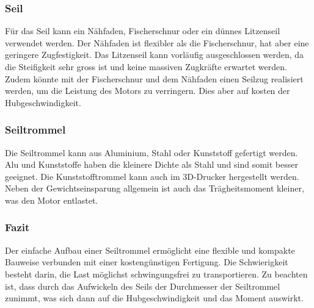 \documentclass[a4paper]{report}
\begin{document}
\subsubsection{Seil}
\label{app:ssec:Seil}
Für das Seil kann ein Nähfaden, Fischerschnur oder ein dünnes Litzenseil verwendet werden. Der Nähfaden ist flexibler als die Fischerschnur, hat aber eine geringere Zugfestigkeit. Das Litzenseil kann vorläufig ausgeschlossen werden, da die Steifigkeit sehr gross ist und keine massiven Zugkräfte erwartet werden. Zudem könnte mit der Fischerschnur und dem Nähfaden einen Seilzug realisiert werden, um die Leistung des Motors zu verringern. Dies aber auf kosten der Hubgeschwindigkeit.

\subsubsection{Seiltrommel}
\label{app:ssec:Seiltrommel}
Die Seiltrommel kann aus Aluminium, Stahl oder Kunststoff gefertigt werden. Alu und Kunststoffe haben die kleinere Dichte als Stahl und sind somit besser geeignet. Die Kunststofftrommel kann auch im 3D-Drucker hergestellt werden. Neben der Gewichtseinsparung allgemein ist auch das Trägheitsmoment kleiner, was den Motor entlastet.

\subsubsection{Fazit}
\label{app:ssec:Fazit}
Der einfache Aufbau einer Seiltrommel ermöglicht eine flexible und kompakte Bauweise verbunden mit einer kostengünstigen Fertigung. Die Schwierigkeit besteht darin, die Last möglichst schwingungsfrei zu transportieren. Zu beachten ist, dass durch das Aufwickeln des Seils der Durchmesser der Seiltrommel zunimmt, was sich dann auf die Hubgeschwindigkeit und das Moment auswirkt.
\end{document}
